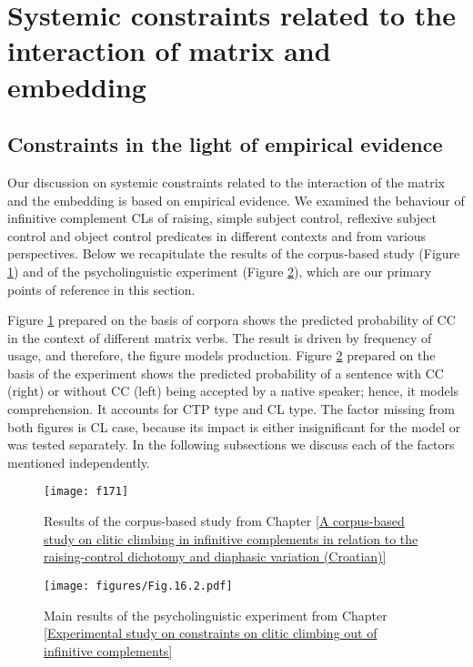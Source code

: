 \section{Systemic constraints related to the interaction of matrix and embedding}
\label{Systemic constraints related to the interaction of matrix and embedding}
\subsection{Constraints in the light of empirical evidence}
\label{Constraints in the light of empirical evidence}

Our discussion on systemic constraints related to the interaction of the matrix and the embedding is based on empirical evidence. We examined the behaviour of infinitive complement CLs of raising, simple subject control, reflexive subject control and object control predicates in different contexts and from various perspectives. Below we recapitulate the results of the corpus-based study (Figure \ref{F17.1}) and of the psycholinguistic experiment (Figure \ref{F17.2}), which are our primary points of reference in this section. 

Figure \ref{F17.1} prepared on the basis of corpora shows the predicted probability of CC in the context of different matrix verbs. The result is driven by frequency of usage, and therefore, the figure models production. Figure \ref{F17.2} prepared on the basis of the experiment shows the predicted probability of a sentence with CC (right) or without CC (left) being accepted by a native speaker; hence, it models comprehension. It accounts for CTP type and CL type. The factor missing from both figures is CL case, because its impact is either insignificant for the model or was tested separately. In the following subsections we discuss each of the factors mentioned independently.

\begin{figure}
\caption{Results of the corpus-based study from Chapter \ref{A corpus-based study on clitic climbing in infinitive complements in relation to the raising-control dichotomy and diaphasic variation (Croatian)}}
\label{F17.1}
\texttt{[image: f171]}
\end{figure}

\begin{figure}
\caption{Main results of the psycholinguistic experiment from Chapter \ref{Experimental study on constraints on clitic climbing out of infinitive complements}}
\label{F17.2}
\texttt{[image: figures/Fig.16.2.pdf]}
\end{figure}


